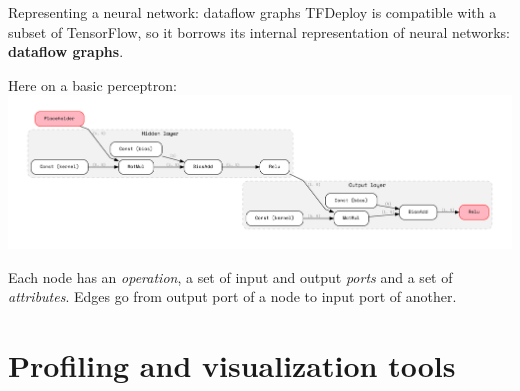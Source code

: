 \documentclass{beamer}
\begin{document}
\begin{frame}{Representing a neural network: dataflow graphs}
TFDeploy is compatible with a subset of TensorFlow, so it borrows its internal representation of neural networks: \textbf{dataflow graphs}.

\vspace{1em}
Here on a basic perceptron:
\hspace*{-1.7em}
\includegraphics[width=1.1\textwidth]{example-perceptron.pdf}

\vspace{.5em}
\small
Each node has an \textit{operation}, a set of input and output \textit{ports} and a set of \textit{attributes}. Edges go from output port of a node to input port of another.

\end{frame}

\section{Profiling and visualization tools}
\end{document}
